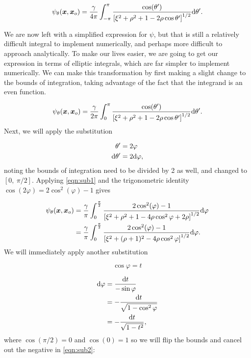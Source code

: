 \begin{equation}
    \psi_\theta(\bm{x},\bm{x}_o) = \frac{\gamma}{4\pi} \int_{-\pi}^{\pi} \frac{ \cos(\theta')}{\left[ \xi^2  + \rho^2 + 1 -2\rho\cos\theta' \right]^{1/2}} \mathrm{d}\theta'.
\end{equation}

We are now left with a simplified expression for \(\psi\), but that is still a relatively difficult integral to implement numerically, and perhaps more difficult to approach analytically.
%
To make our lives easier, we are going to get our expression in terms of elliptic integrals, which are far simpler to implement numerically.
%
We can make this transformation by first making a slight change to the bounds of integration, taking advantage of the fact that the integrand is an even function.

\begin{equation}
    \psi_\theta(\bm{x},\bm{x}_o) = \frac{\gamma}{2\pi} \int_{0}^{\pi} \frac{ \cos(\theta')}{\left[ \xi^2  + \rho^2 + 1 -2\rho\cos\theta' \right]^{1/2}} \mathrm{d}\theta'.
\end{equation}
%
Next, we will apply the substitution

\begin{align}
    \label{eqn:sub1}
    \theta' &= 2\varphi \\
    \mathrm{d}\theta' &= 2\mathrm{d}\varphi,
\end{align}
%
noting the bounds of integration need to be divided by 2 as well, and changed to \([0,~\pi/2]\).
%
Applying \cref{eqn:sub1} and the trigonometric identity \(\cos(2\varphi) = 2\cos^2(\varphi)-1\) gives

\begin{equation}
    \begin{aligned}
        \psi_\theta(\bm{x},\bm{x}_o) &= \frac{\gamma}{\pi} \int_{0}^{\frac{\pi}{2}} \frac{ 2\cos^2(\varphi)-1}{\left[ \xi^2  + \rho^2 + 1 - 4\rho\cos^2\varphi + 2\rho\right]^{1/2}} \mathrm{d}\varphi \\
         &= \frac{\gamma}{\pi} \int_{0}^{\frac{\pi}{2}} \frac{ 2\cos^2(\varphi)-1}{\left[ \xi^2  + (\rho + 1)^2 - 4\rho\cos^2\varphi \right]^{1/2}} \mathrm{d}\varphi.
    \end{aligned}
\end{equation}
%
We will immediately apply another substitution

\begin{equation}
    \cos\varphi = t
\end{equation}

\begin{equation}
    \label{eqn:sub2}
\begin{aligned}
    \mathrm{d}\varphi &= \frac{\mathrm{d}{t}}{-\sin{\varphi}} \\
              &= -\frac{\mathrm{d}{t}}{\sqrt{1-\cos^2{\varphi}}} \\
              &= -\frac{\mathrm{d}{t}}{\sqrt{1-t^2}},
\end{aligned}
\end{equation}
%
where \(\cos{(\pi/2)}=0\) and \(\cos(0) = 1\) so we will flip the bounds and cancel out the negative in \cref{eqn:sub2}:

